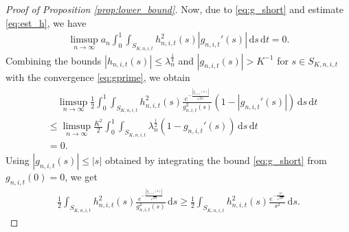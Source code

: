 \documentclass[11pt]{article}
\numberwithin{statement}{section}
\numberwithin{equation}{section}
\theoremstyle{remark}
\newcommand{\intd}{\, \mathrm{d}} 				%
\begin{document}
\begin{proof}[Proof of Proposition \ref{prop:lower_bound}]
	Now, due to \eqref{eq:g_short} and estimate
        \eqref{eq:est_h}, we have
	\begin{align}\label{eq:x_2}
		\limsup_{n\to \infty} a_n \int_{0}^1 \int_{ S_{K,n,i,t}} 
		            h^2_{n,i,t}(s) |g_{n,i,t}'(s)|\intd s \intd t = 0.
	\end{align}
        Combining the bounds
        $|h_{n,i,t}(s)| \leq \lambda_n^\frac{1}{4}$ and
        $|g_{n,i,t}(s)| >K^{-1}$ for $s \in S_{K,n,i,t}$ with the
        convergence \eqref{eq:gprime}, we obtain 
	\begin{align}\label{eq:random_exponent_explained}
	  \begin{split}
            &\quad \limsup_{n \to \infty} \frac{1}{2} \int_0^1 \int_{
              S_{K,n,i,t}} h^2_{n,i,t}(s) \frac{e^{-\frac{
                  |g_{n,i,t}(s)| }{ \sqrt{2 \pi}}
              }}{g^2_{n,i,t}(s)} \left(1
              - |g_{n,i,t}'(s)| \right) \intd s \intd t\\
            & \leq \limsup_{n \to \infty} \frac{K^2}{2} \int_0^1
            \int_{ S_{K,n,i,t}} \lambda_n^\frac{1}{2} \left(1
              - g_{n,i,t}'(s) \right) \intd s \intd t\\
            & = 0.
	  \end{split}
	\end{align}
	Using $|g_{n,i,t}(s)| \leq |s|$ obtained by integrating the
        bound \eqref{eq:g_short} from $g_{n,i,t}(0) = 0$, we
        get \begin{align}\label{eq:throw_out_g} \frac{1}{2} \int_{
            S_{K,n,i,t}} h^2_{n,i,t}(s)
          \frac{e^{-\frac{|g_{n,i,t}(s)|}{ \sqrt{2\pi}
              }}}{g^2_{n,i,t}(s)} \intd s \geq \frac{1}{2} \int_{
            S_{K,n,i,t}} h^2_{n,i,t}(s) \frac{e^{-
              \frac{|s|}{\sqrt{2\pi}}} }{s^2}\intd s.
	\end{align}
	

\end{proof}
\end{document}
